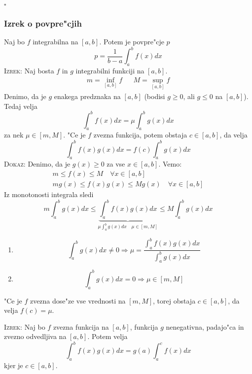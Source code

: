\hfill $\square$
\subsubsection{Izrek o povpre"cjih}
Naj bo $f$ integrabilna na $[a, b]$. Potem je povpre"cje $p$
\begin{equation*}
p = \dfrac{1}{b - a} \int_{a}^{b}f(x) dx
\end{equation*}
%
\textsc{Izrek:} Naj bosta $f$ in $g$ integrabilni funkciji na $[a, b]$.
\begin{align*}
m = \inf_{[a, b]} f && M = \sup_{[a, b]} f
\end{align*}
Denimo, da je $g$ enakega predznaka na $[a, b]$ (bodisi $g \geq 0$, ali $g \leq 0$ na $[a, b]$). Tedaj velja
\begin{equation*}
\int_{a}^{b} f(x) dx = \mu \int_{a}^b g(x) dx
\end{equation*}
za nek $\mu \in [m, M]$. "Ce je $f$ zvezna funkcija, potem obstaja $c \in [a, b]$, da velja
\begin{equation*}
\int_{a}^{b} f(x) g(x) dx = f(c) \int_a^b g(x) dx
\end{equation*}
\textsc{Dokaz:} Denimo, da je $g(x) \geq 0$ za vse $x \in [a, b]$. Vemo:
\begin{gather*}
m \leq f(x) \leq M \quad \forall x \in [a, b] \\
m g(x) \leq f(x) g(x) \leq M g(x) \quad \forall x \in [a, b]
\end{gather*}
Iz monotonosti integrala sledi
\begin{equation*}
m \int_{a}^{b} g(x) dx \leq \underbrace{\int_{a}^{b} f(x) g(x) dx}_{\mu \int_a^b g(x) dx \quad \mu \in [m, M]} \leq M \int_a^b g(x) dx
\end{equation*}
\begin{enumerate}
	\item 
	\begin{equation*}
	\int_a^b g(x) dx \neq 0 \Rightarrow \mu = \dfrac{\int_a^b f(x) g(x) dx}{\int_a^b g(x) dx}
	\end{equation*}
	
	\item
	\begin{equation*}
	\int_a^b g(x) dx = 0 \Rightarrow \mu \in [m, M]
	\end{equation*}
\end{enumerate}
"Ce je $f$ zvezna dose"ze vse vrednosti na $[m, M]$, torej obstaja $c \in [a, b]$, da velja $f(c) = \mu$.

\textsc{Izrek:} Naj bo $f$ zvezna funkcija na $[a, b]$, funkcija $g$ nenegativna, padajo"ca in zvezno odvedljiva na $[a, b]$. Potem velja
\begin{equation*}
\int_a^b f(x) g(x) dx = g(a) \int_a^c f(x) dx
\end{equation*}
kjer je $c \in [a, b]$.

